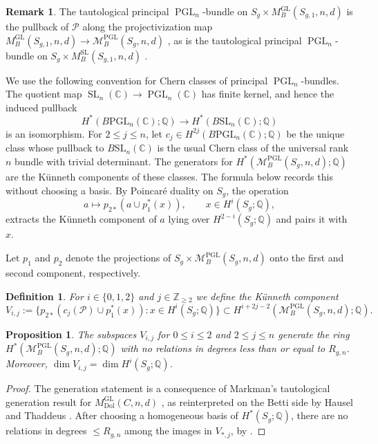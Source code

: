 \documentclass[11pt,reqno]{amsart}
\theoremstyle{plain} %
\newtheorem{prop}[theorem]{Proposition}
\newtheorem{definition}[theorem]{Definition}
\theoremstyle{definition}
\newtheorem{remark}[theorem]{Remark}
\newcommand{\QQ}{\mathbb{Q}}
\newcommand{\CC}{\mathbb{C}}
\newcommand{\M}{\mathcal{M}}
\newcommand{\mc}{\mathcal}
\newcommand{\ZZ}{\mathbb{Z}}
\DeclareMathOperator{\GL}{GL}
\DeclareMathOperator{\SL}{SL}
\DeclareMathOperator{\PGL}{PGL}
\newcommand{\BSL}{B\mathrm{SL}}
\newcommand{\BPGL}{B\mathrm{PGL}}
\newcommand{\Dol}{\mathrm{Dol}}
\begin{document}
\begin{remark}
    The tautological principal $\PGL_n$-bundle on $S_g \times M_B^{\GL}(S_{g,1},n,d)$ is the pullback of $\mc P$ along the projectivization map $M_B^{\GL}(S_{g,1},n,d) \to \M_B^{\PGL}(S_g,n,d)$ \cite[\S 1]{hausel-thaddeus-generation-pgl2}, as is the tautological principal $\PGL_n$-bundle on $S_g \times M_B^{\SL}(S_{g,1},n,d)$ \cite[\S 4.1]{Hausel-RV}.
\end{remark}




We use the following convention for Chern classes of principal $\PGL_n$-bundles. The quotient map $\SL_n(\CC) \to \PGL_n(\CC)$ has finite kernel, and hence the induced pullback
\[
H^*(\BPGL_n(\CC);\QQ) \longrightarrow
H^*(\BSL_n(\CC);\QQ)
\]
is an isomorphism. For $2 \le j \le n$, let $c_j \in H^{2j}(\BPGL_n(\CC);\QQ)$ be the unique class whose pullback to $\BSL_n(\CC)$ is the usual Chern class of the universal rank $n$ bundle with trivial determinant. The generators for $H^*(\M_B^{\PGL}(S_g,n,d); \QQ)$ are the K\"unneth components of these classes. The formula below records this without choosing a
basis. By Poincar\'e duality on $S_g$, the operation
\[
a \longmapsto p_{2*}(a \cup p_1^*(x)), \qquad x \in H^i(S_g;\QQ),
\]
extracts the K\"unneth component of $a$ lying over $H^{2-i}(S_g;\QQ)$ and pairs it with $x$. %

Let $p_1$ and $p_2$ denote the projections of $S_g \times \M_B^{\PGL}(S_g,n,d)$ onto the first and second component, respectively.

\begin{definition}\label{def: alpha, beta, psi}
    For $i \in \{0,1,2\}$ and $j \in \ZZ_{\ge 2}$ we define the K\"unneth component $$V_{i,j} := \{p_{2*}(c_j(\mc P) \cup p_1^*(x)): x \in H^i(S_g;\QQ)\} \subset H^{i+2j-2}(\M_B^{\PGL}(S_g,n,d); \QQ).$$
\end{definition}

 

\begin{prop}\label{prop: free generation} %
    The subspaces $V_{i,j}$ for $0 \le i \le 2$ and $2 \le j \le n$ generate the ring $H^*(\M^{\PGL}_B(S_g,n,d); \QQ)$ with no relations in degrees less than or equal to $R_{g,n}$. Moreover, $\dim V_{i,j} = \dim H^i(S_g; \QQ)$.
\end{prop}

\begin{proof}
The generation statement is a consequence of Markman's tautological generation result for $M_{\Dol}^{\GL}(C,n,d)$ \cite[Theorem~7]{Markman}, as reinterpreted on the Betti side by Hausel and Thaddeus \cite[(5.1)]{hausel-thaddeus-generation-pgl2}. After choosing a homogeneous basis of $H^*(S_g; \QQ)$, there are no relations in degrees $ \le R_{g,n}$ among the images in $V_{*,j}$, by \cite[Lemma 4.1.12]{Hausel-RV}.
\end{proof}
\end{document}
